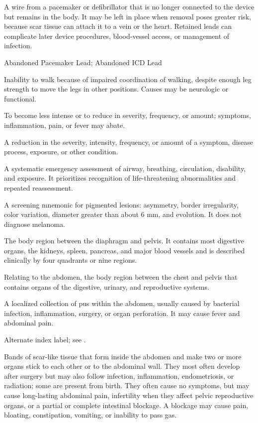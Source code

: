  A wire from a pacemaker or defibrillator that is no longer connected to the device but remains in the body. It may be left in place when removal poses greater risk, because scar tissue can attach it to a vein or the heart. Retained leads can complicate later device procedures, blood-vessel access, or management of infection.

\synonyms
Abandoned Pacemaker Lead; Abandoned ICD Lead

 Inability to walk because of impaired coordination of walking, despite enough leg strength to move the legs in other positions. Causes may be neurologic or functional.

 To become less intense or to reduce in severity, frequency, or amount; symptoms, inflammation, pain, or fever may abate.

 A reduction in the severity, intensity, frequency, or amount of a symptom, disease process, exposure, or other condition.

 A systematic emergency assessment of airway, breathing, circulation, disability, and exposure. It prioritizes recognition of life-threatening abnormalities and repeated reassessment.

 A screening mnemonic for pigmented lesions: asymmetry, border irregularity, color variation,
diameter greater than about 6 mm, and evolution. It does not diagnose melanoma.

 The body region between the diaphragm and pelvis. It contains most digestive organs, the kidneys, spleen, pancreas, and
major blood vessels and is described clinically by four quadrants or nine regions.

 Relating to the abdomen, the body region between the chest and pelvis that contains organs of the digestive, urinary, and reproductive systems.

 A localized collection of pus within the abdomen, usually caused by bacterial infection, inflammation, surgery, or organ perforation. It may cause fever and abdominal pain.

 Alternate index label; see .

 Bands of scar-like tissue that form inside the abdomen and make two or more organs stick to each other or to the abdominal wall. They most often develop after surgery but may also follow infection, inflammation, endometriosis, or radiation; some are present from birth. They often cause no symptoms, but may cause long-lasting abdominal pain, infertility when they affect pelvic reproductive organs, or a partial or complete intestinal blockage. A blockage may cause pain, bloating, constipation, vomiting, or inability to pass gas.

